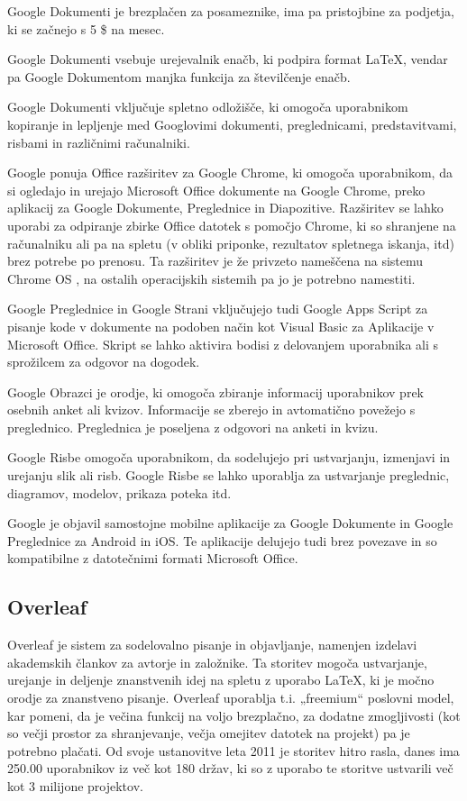 \documentclass[a4paper, 12pt]{book}
\begin{document}
Google Dokumenti je brezplačen za posameznike, ima pa pristojbine za podjetja, ki se začnejo s 5 \$ na mesec. \cite{59} 

Google Dokumenti vsebuje urejevalnik enačb, ki podpira format {\LaTeX}, vendar pa Google Dokumentom manjka funkcija za številčenje enačb. \cite{61,62}

Google Dokumenti vključuje spletno odložišče, ki omogoča uporabnikom kopiranje in lepljenje  med Googlovimi dokumenti, preglednicami, predstavitvami, risbami in različnimi računalniki. \cite{63}

Google ponuja Office razširitev za Google Chrome, ki omogoča uporabnikom, da si ogledajo in urejajo Microsoft Office dokumente na Google Chrome, preko aplikacij za Google Dokumente, Preglednice in Diapozitive. Razširitev se lahko uporabi za odpiranje zbirke Office datotek s pomočjo Chrome, ki so shranjene na računalniku  ali pa na spletu (v obliki priponke, rezultatov spletnega iskanja, itd) brez potrebe po prenosu. Ta razširitev je že privzeto nameščena na sistemu Chrome OS \cite{64}, na ostalih operacijskih sistemih pa jo je potrebno namestiti. 

Google Preglednice in Google Strani vključujejo tudi Google Apps Script za pisanje kode v dokumente na podoben način kot Visual Basic za Aplikacije v Microsoft Office. Skript se lahko aktivira bodisi z delovanjem uporabnika ali s sprožilcem za odgovor na dogodek. \cite{68} \cite{69}

Google Obrazci je orodje, ki omogoča zbiranje informacij uporabnikov prek osebnih anket ali kvizov. Informacije se zberejo in avtomatično povežejo s preglednico. Preglednica je poseljena z odgovori na anketi in kvizu. \cite{70} \cite{71}

Google Risbe omogoča uporabnikom, da sodelujejo pri ustvarjanju, izmenjavi in urejanju slik ali risb. Google Risbe se lahko uporablja za ustvarjanje preglednic, diagramov, modelov, prikaza poteka itd. \cite{72} \cite{73}

Google je objavil samostojne mobilne aplikacije za Google Dokumente in Google Preglednice za Android in iOS. Te aplikacije delujejo tudi brez povezave in so kompatibilne z datotečnimi formati Microsoft Office. \cite{80}



\subsection{Overleaf}
\label{overleaf}

Overleaf je sistem za sodelovalno pisanje in objavljanje, namenjen izdelavi akademskih člankov za avtorje in založnike. Ta storitev mogoča ustvarjanje, urejanje in deljenje znanstvenih idej na spletu z uporabo {\LaTeX}, ki je močno orodje za znanstveno pisanje. Overleaf uporablja t.i. „freemium“ poslovni model, kar pomeni, da je večina funkcij na voljo brezplačno, za dodatne zmogljivosti (kot so večji prostor za shranjevanje, večja omejitev datotek na projekt) pa je potrebno plačati. Od svoje ustanovitve leta 2011 je storitev hitro rasla, danes ima 250.00 uporabnikov iz več kot 180 držav, ki so z uporabo te storitve ustvarili več kot 3 milijone projektov.
\end{document}
